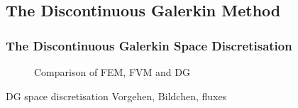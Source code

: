 	\subsection{The Discontinuous Galerkin Method}
	\begin{frame}
		\frametitle{The Discontinuous Galerkin Space Discretisation}
		\begin{figure}
			\centering
			\caption{Comparison of FEM, FVM and DG}
			\label{fig:1}
		\end{figure}

		DG space discretisation Vorgehen, Bildchen, fluxes
	\end{frame}
